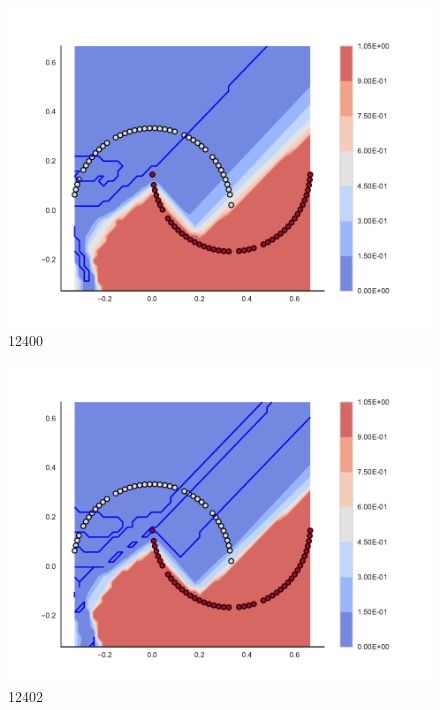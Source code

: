 \begin{subfigure}[b]{0.09\textwidth}
    \includegraphics[clip, trim=2.35cm 1.75cm 4.5cm 0cm,width=\textwidth]{img/convergence/12400.pdf}
    \caption{12400}
    \label{fig:convergence_12400}
\end{subfigure}
%
\begin{subfigure}[b]{0.09\textwidth}
    \includegraphics[clip, trim=2.35cm 1.75cm 4.5cm 0cm,width=\textwidth]{img/convergence/12402.pdf}
    \caption{12402}
    \label{fig:convergence_12402}
\end{subfigure}
%
